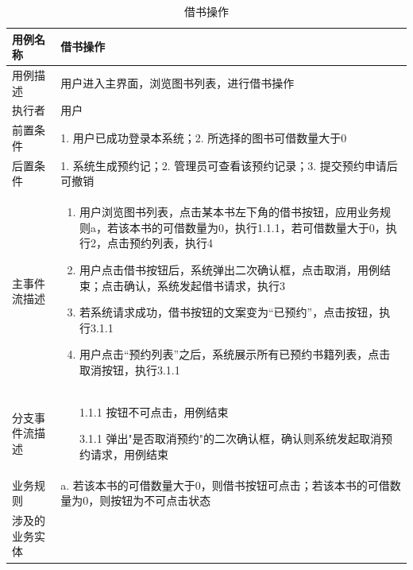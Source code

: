 \begin{table}[hp]
    \centering
    \caption{借书操作}
	\begin{tabular*}{\textwidth}{p{}|p{}}
    \hline
    用例名称    & 借书操作    \\ \hline
    用例描述    & 用户进入主界面，浏览图书列表，进行借书操作    \\ \hline
    执行者     & 用户         \\ \hline
    前置条件    & 1. 用户已成功登录本系统；2. 所选择的图书可借数量大于0  
     \\ \hline
    后置条件    & 1. 系统生成预约记；2. 管理员可查看该预约记录；3. 提交预约申请后可撤销  
    \\ \hline
    主事件流描述  & \begin{enumerate} 
            \item 用户浏览图书列表，点击某本书左下角的借书按钮，应用业务规则a，若该本书的可借数量为0，执行1.1.1，若可借数量大于0，执行2，点击预约列表，执行4
            \item 用户点击借书按钮后，系统弹出二次确认框，点击取消，用例结束；点击确认，系统发起借书请求，执行3
            \item 若系统请求成功，借书按钮的文案变为“已预约”，点击按钮，执行3.1.1
            \item 用户点击“预约列表”之后，系统展示所有已预约书籍列表，点击取消按钮，执行3.1.1
        \end{enumerate} \\ \hline
    分支事件流描述 & \begin{itemize}
        \item[1.1.1]  按钮不可点击，用例结束
        \item[3.1.1] 弹出"是否取消预约"的二次确认框，确认则系统发起取消预约请求，用例结束      
    \end{itemize} \\ \hline
    业务规则    &  a. 若该本书的可借数量大于0，则借书按钮可点击；若该本书的可借数量为0，则按钮为不可点击状态  \\ \hline
    涉及的业务实体 & ~     \\ \hline
\end{tabular*}
\end{table}
